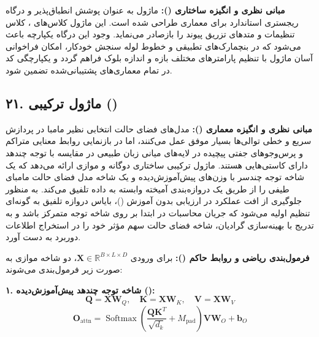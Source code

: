 \textbf{مبانی نظری و انگیزه ساختاری ():}
ماژول  به عنوان پوشش انطباق‌پذیر و درگاه ریجستری استاندارد برای معماری  طراحی شده است. این ماژول کلاس‌های ، کلاس تنظیمات  و متدهای تزریق پیوند  را بازصادر می‌نماید.
وجود این درگاه یکپارچه باعث می‌شود که در بنچمارک‌های تطبیقی و خطوط لوله سنجش خودکار، امکان فراخوانی آسان ماژول با تنظیم پارامترهای مختلف بازه و اندازه بلوک فراهم گردد و یکپارچگی کد در تمام معماری‌های پشتیبانی‌شده تضمین شود.



\subsection*{۲۱. ماژول ترکیبی  ()}

\textbf{مبانی نظری و انگیزه معماری ():}
مدل‌های فضای حالت انتخابی نظیر مامبا در پردازش سریع و خطی توالی‌ها بسیار موفق عمل می‌کنند، اما در بازنمایی روابط معنایی متراکم و پرس‌وجوهای جفتی پیچیده در لایه‌های میانی زبان طبیعی در مقایسه با توجه چندهد دارای کاستی‌هایی هستند. ماژول ترکیبی  ساختاری دوگانه و موازی ارائه می‌دهد که یک شاخه توجه چندسر با وزن‌های پیش‌آموزش‌دیده و یک شاخه مدل فضای حالت مامبای طیفی را از طریق یک دروازه‌بندی آمیخته وابسته به داده تلفیق می‌کند.
به منظور جلوگیری از افت عملکرد در ارزیابی بدون آموزش ()، بایاس دروازه تلفیق به گونه‌ای تنظیم اولیه می‌شود که جریان محاسبات در ابتدا بر روی شاخه توجه متمرکز باشد و به تدریج با بهینه‌سازی گرادیان، شاخه فضای حالت سهم مؤثر خود را در استخراج اطلاعات دوربرد به دست آورد.

\textbf{فرمول‌بندی ریاضی و روابط حاکم ():}
برای ورودی $\mathbf{X} \in \mathbb{R}^{B \times L \times D}$، دو شاخه موازی به صورت زیر فرمول‌بندی می‌شوند:

\textbf{۱. شاخه توجه چندهد پیش‌آموزش‌دیده ():}
\begin{equation}
\mathbf{Q} = \mathbf{X}\mathbf{W}_Q, \quad \mathbf{K} = \mathbf{X}\mathbf{W}_K, \quad \mathbf{V} = \mathbf{X}\mathbf{W}_V
\end{equation}
\begin{equation}
\mathbf{O}_{\text{attn}} = \operatorname{Softmax}\left(\frac{\mathbf{Q} \mathbf{K}^T}{\sqrt{d_k}} + M_{\text{pad}}\right) \mathbf{V} \mathbf{W}_O + \mathbf{b}_O
\end{equation}

